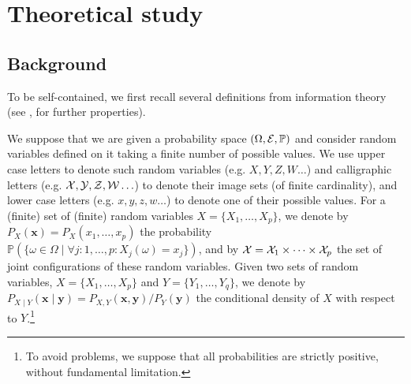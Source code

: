 \section{Theoretical study}
\label{sec:6:theory}

\subsection{Background}

To be self-contained, we first recall several definitions from information
theory (see \citep{cover:2012}, for further properties).

We suppose that we are given a probability space $(\Omega, {\cal E},
\mathbb{P})$ and  consider random variables defined on it taking a finite
number of possible values. We use upper case letters to denote such random
variables (e.g. $X, Y, Z, W \ldots$)  and calligraphic letters (e.g. $\cal X,
Y, Z, W \ldots$) to denote their image sets (of finite cardinality), and lower
case letters (e.g. $x, y, z, w \ldots$) to denote one of their possible values.
For a (finite) set of (finite) random variables $ X = \{X_{1}, \ldots ,
X_{p}\}$, we denote by $P_{X}(\mathbf{x}) = P_{X}(x_{1}, \ldots , x_{p})$ the
probability $\mathbb{P}(\{ \omega \in \Omega \mid  \forall j : 1, \ldots, p:
X_j(\omega) =x_j\})$, and by ${\cal X} = {\cal X}_{1} \times \cdots
\times {\cal X}_{p}$ the set of joint configurations of these random variables.
Given two sets of random variables, $X = \{X_{1}, \ldots , X_{p}\}$ and
$Y=\{Y_{1}, \ldots , Y_{q}\}$, we denote by $P_{X \mid Y}(\mathbf{x} \mid \mathbf{y}) = {P_{X, Y}
(\mathbf{x},  \mathbf{y})}/ {P_{Y}(\mathbf{y})}$ the conditional density of $X$ with respect to
$Y$.\footnote{To avoid problems, we suppose that all probabilities are strictly
positive, without fundamental limitation.}

